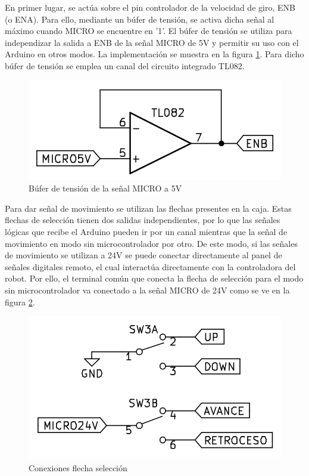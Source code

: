 En primer lugar, se actúa sobre el pin controlador de la velocidad de giro, ENB (o ENA). Para ello, mediante
un búfer de tensión, se activa dicha señal al máximo cuando MICRO se encuentre en '1'. El búfer de tensión
se utiliza para independizar la salida a ENB de la señal MICRO de 5V y permitir su uso con el Arduino en otros modos.
La implementación se muestra en la figura \ref{fig:buferenb}. Para dicho búfer de tensión se emplea un canal
del circuito integrado TL082.

\begin{figure}[hbtp]
    \centering
    \includegraphics[scale=1.25]{03-placa/buferenb.jpg}
    \caption{Búfer de tensión de la señal MICRO a 5V}
    \label{fig:buferenb}
    \end{figure}

Para dar señal de movimiento se utilizan las flechas presentes en la caja. Estas flechas de selección tienen
dos salidas independientes, por lo que las señales lógicas que recibe el Arduino pueden ir por un canal 
mientras que la señal de movimiento en modo sin microcontrolador por otro. De este modo, si las señales de 
movimiento se utilizan a 24V se puede conectar directamente al panel de señales digitales remoto, el cual
interactúa directamente con la controladora del robot. Por ello, el terminal común que conecta la flecha de 
selección para el modo sin microcontrolador va conectado a la señal MICRO de 24V como se ve en la figura
\ref{fig:flecha}.

\begin{figure}[hbtp]
    \centering
    \includegraphics[scale=1.25]{03-placa/flecha.jpg}
    \caption{Conexiones flecha selección}
    \label{fig:flecha}
    \end{figure}

